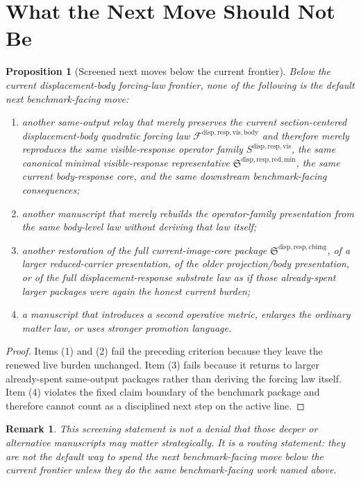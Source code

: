 \documentclass[11pt]{article}
\newcommand{\VisibleBodyForcingLaw}{\mathscr F^{\mathrm{disp,resp,vis,body}}}
\newcommand{\VisibleResponseOperator}{S^{\mathrm{disp,resp,vis}}}
\newcommand{\MinimalReducedStructure}{\mathfrak S^{\mathrm{disp,resp,red,min}}}
\newcommand{\CurrentBodyImageCore}{\mathfrak S^{\mathrm{disp,resp,cbimg}}}
\newtheorem{proposition}{Proposition}
\newtheorem{remark}{Remark}
\begin{document}
\section{What the Next Move Should Not Be}

\begin{proposition}[Screened next moves below the current frontier]
Below the current displacement-body forcing-law frontier, none of the following is the default next benchmark-facing move:
\begin{enumerate}
    \item another same-output relay that merely preserves the current section-centered displacement-body quadratic forcing law \(\VisibleBodyForcingLaw\) and therefore merely reproduces the same visible-response operator family \(\VisibleResponseOperator\), the same canonical minimal visible-response representative \(\MinimalReducedStructure\), the same current body-response core, and the same downstream benchmark-facing consequences;
    \item another manuscript that merely rebuilds the operator-family presentation from the same body-level law without deriving that law itself;
    \item another restoration of the full current-image-core package \(\CurrentBodyImageCore\), of a larger reduced-carrier presentation, of the older projection/body presentation, or of the full displacement-response substrate law as if those already-spent larger packages were again the honest current burden;
    \item a manuscript that introduces a second operative metric, enlarges the ordinary matter law, or uses stronger promotion language.
\end{enumerate}
\end{proposition}

\begin{proof}
Items (1) and (2) fail the preceding criterion because they leave the renewed live burden unchanged. Item (3) fails because it returns to larger already-spent same-output packages rather than deriving the forcing law itself. Item (4) violates the fixed claim boundary of the benchmark package and therefore cannot count as a disciplined next step on the active line.
\end{proof}

\begin{remark}
This screening statement is not a denial that those deeper or alternative manuscripts may matter strategically. It is a routing statement: they are not the default way to spend the next benchmark-facing move below the current frontier unless they do the same benchmark-facing work named above.
\end{remark}
\end{document}

